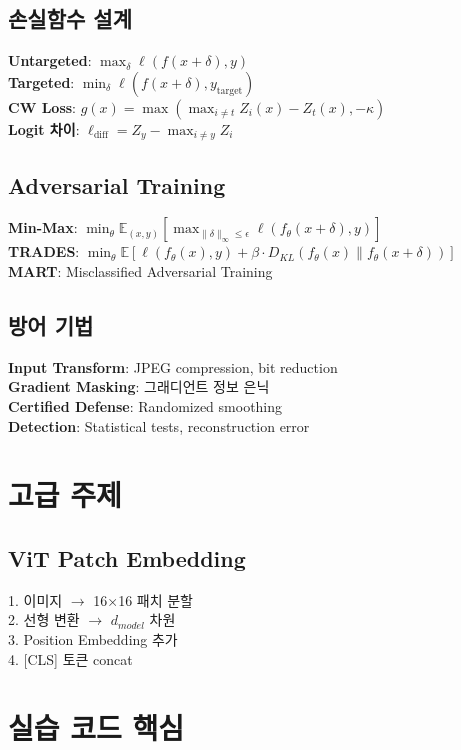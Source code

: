 \documentclass[6pt,landscape,a4paper]{article}
\begin{document}
\begin{multicols}{3}
\subsection{손실함수 설계}
\textbf{Untargeted}: $\max_\delta \ell(f(x + \delta), y)$\\
\textbf{Targeted}: $\min_\delta \ell(f(x + \delta), y_{\text{target}})$\\
\textbf{CW Loss}: $g(x) = \max(\max_{i \neq t} Z_i(x) - Z_t(x), -\kappa)$\\
\textbf{Logit 차이}: $\ell_{\text{diff}} = Z_y - \max_{i \neq y} Z_i$

\subsection{Adversarial Training}
\textbf{Min-Max}: $\min_\theta \mathbb{E}_{(x,y)} \left[ \max_{\|\delta\|_\infty \leq \epsilon} \ell(f_\theta(x + \delta), y) \right]$\\
\textbf{TRADES}: $\min_\theta \mathbb{E} \left[ \ell(f_\theta(x), y) + \beta \cdot D_{KL}(f_\theta(x) \| f_\theta(x + \delta)) \right]$\\
\textbf{MART}: Misclassified Adversarial Training

\subsection{방어 기법}
\textbf{Input Transform}: JPEG compression, bit reduction\\
\textbf{Gradient Masking}: 그래디언트 정보 은닉\\
\textbf{Certified Defense}: Randomized smoothing\\
\textbf{Detection}: Statistical tests, reconstruction error

\section{고급 주제}
\subsection{ViT Patch Embedding}
1. 이미지 $\rightarrow$ 16×16 패치 분할\\
2. 선형 변환 $\rightarrow$ $d_{model}$ 차원\\
3. Position Embedding 추가\\
4. [CLS] 토큰 concat
\section{실습 코드 핵심}

\end{multicols}
\end{document}
